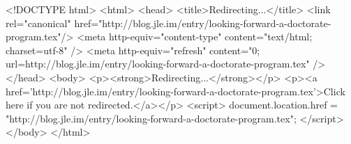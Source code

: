 <!DOCTYPE html>
<html>
<head>
<title>Redirecting...</title>
<link rel="canonical" href="http://blog.jle.im/entry/looking-forward-a-doctorate-program.tex"/>
<meta http-equiv="content-type" content="text/html; charset=utf-8" />
<meta http-equiv="refresh" content="0; url=http://blog.jle.im/entry/looking-forward-a-doctorate-program.tex" />
</head>
<body>
  <p><strong>Redirecting...</strong></p>
  <p><a href='http://blog.jle.im/entry/looking-forward-a-doctorate-program.tex'>Click here if you are not redirected.</a></p>
  <script>
    document.location.href = "http://blog.jle.im/entry/looking-forward-a-doctorate-program.tex";
  </script>
</body>
</html>
